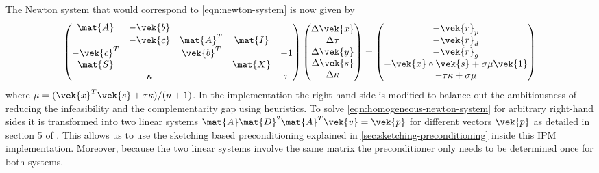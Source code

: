 The Newton system that would correspond to \cref{eqn:newton-system} is now given by
\begin{equation}\label{eqn:homogeneous-newton-system}
  \begin{pmatrix}
    \mat{A}    & -\vek{b} &           &         &         \\
               & -\vek{c} & \mat{A}^T & \mat{I} &         \\
    -\vek{c}^T &          & \vek{b}^T &         & -1 \\
    \mat{S}    &          &           & \mat{X} &         \\
               & \kappa   &           &         & \tau
  \end{pmatrix}
  \begin{pmatrix}
    \Delta\vek{x} \\
    \Delta\tau \\
    \Delta\vek{y} \\
    \Delta\vek{s} \\
    \Delta\kappa
  \end{pmatrix}
  =
  \begin{pmatrix}
    -\vek{r}_p \\
    -\vek{r}_d \\
    -\vek{r}_g \\
    -\vek{x} \circ \vek{s} + \sigma \mu \vek{1} \\
    -\tau \kappa + \sigma \mu
  \end{pmatrix}
\end{equation}
where \(\mu = (\vek{x}^T \vek{s} + \tau \kappa)/(n+1)\).
In the implementation the right-hand side is modified to balance out the ambitiousness of reducing the infeasibility and the complementarity gap using heuristics.
To solve \cref{eqn:homogeneous-newton-system} for arbitrary right-hand sides it is transformed into two linear systems \(\mat{A}\mat{D}^2\mat{A}^T\vek{v} = \vek{p}\) for different vectors \(\vek{p}\) as detailed in section 5 of \cite{AndersenAndersen-MosekInteriorPointMethod}.
This allows us to use the sketching based preconditioning explained in \cref{sec:sketching-preconditioning} inside this IPM implementation.
Moreover, because the two linear systems involve the same matrix the preconditioner only needs to be determined once for both systems.


